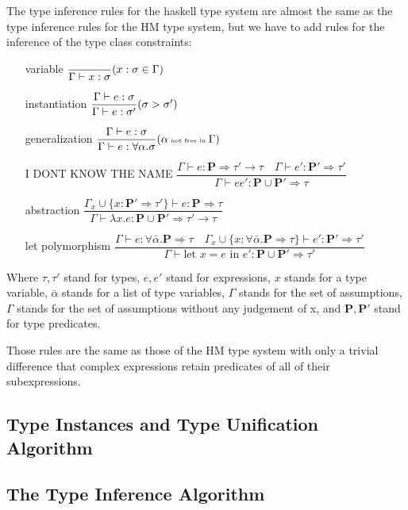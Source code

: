 The type inference rules for the haskell type system are almost the same as the type inference rules for the HM type system, but we have to add rules for the inference of the type class constraints:

\begin{enumerate}
    \item[variable] $\dfrac{}{\Gamma \vdash x : \sigma}\tiny{(x : \sigma \in \Gamma)}$
    \item[instantiation] $\dfrac{\Gamma \vdash e : \sigma}{\Gamma \vdash e : \sigma'}\tiny{(\sigma > \sigma')}$
    \item[generalization] $\dfrac{\Gamma \vdash e : \sigma}{\Gamma \vdash e : \forall \alpha . \sigma}\tiny{(\alpha \text{ not free in }\Gamma)}$
    \item[I DONT KNOW THE NAME] $\dfrac{\Gamma \vdash e : \mathbf{P} \Rightarrow \tau' \rightarrow \tau \quad \Gamma \vdash e' : \mathbf{P'} \Rightarrow \tau' }{\Gamma \vdash e e' : \mathbf{P} \cup \mathbf{P'}  \Rightarrow \tau}$ %
    \item[abstraction] $\dfrac{\Gamma_x \cup \{x : \mathbf{P'} \Rightarrow \tau'\} \vdash e : \mathbf{P} \Rightarrow \tau}{\Gamma \vdash \lambda x . e : \mathbf{P} \cup \mathbf{P'} \Rightarrow \tau' \rightarrow \tau}$
    \item[let polymorphism] $\dfrac{\Gamma \vdash e : \forall \bar{\alpha} .  \mathbf{P} \Rightarrow \tau \quad \Gamma_x \cup \{x :\forall \bar{\alpha} .  \mathbf{P} \Rightarrow \tau \} \vdash e' : \mathbf{P'} \Rightarrow \tau'}{\Gamma \vdash \text{let } x = e \text{ in } e' : \mathbf{P} \cup \mathbf{P'} \Rightarrow \tau'}$
\end{enumerate}

Where $\tau, \tau'$ stand for types, $e, e'$ stand for expressions, $x$ stands for a type variable, $\bar{\alpha}$ stands for a list of type variables, $\Gamma$ stands for the set of assumptions, $\Gamma$ stands for the set of assumptions without any judgement of x, and $\mathbf{P}, \mathbf{P'}$ stand for type predicates.

Those rules are the same as those of the HM type system with only a trivial difference that complex expressions retain predicates of all of their subexpressions.

\subsection{Type Instances and Type Unification Algorithm}


\subsection{The Type Inference Algorithm}

